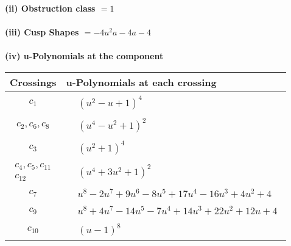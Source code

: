 \documentclass[1p]{elsarticle_modified}
\theoremstyle{definition}
\begin{document}
\flushleft \textbf{(ii) Obstruction class $= 1$}\\~\\
\flushleft \textbf{(iii) Cusp Shapes $= -4 u^2 a-4 a-4$}\\~\\
\newpage\renewcommand{\arraystretch}{1}
\flushleft \textbf{(iv) u-Polynomials at the component}\newline \\
\begin{tabular}{m{50pt}|m{274pt}}
Crossings & \hspace{64pt}u-Polynomials at each crossing \\
\hline $$\begin{aligned}c_{1}\end{aligned}$$&$\begin{aligned}
&(u^2- u+1)^4
\end{aligned}$\\
\hline $$\begin{aligned}c_{2},c_{6},c_{8}\end{aligned}$$&$\begin{aligned}
&(u^4- u^2+1)^2
\end{aligned}$\\
\hline $$\begin{aligned}c_{3}\end{aligned}$$&$\begin{aligned}
&(u^2+1)^4
\end{aligned}$\\
\hline $$\begin{aligned}c_{4},c_{5},c_{11}\\c_{12}\end{aligned}$$&$\begin{aligned}
&(u^4+3 u^2+1)^2
\end{aligned}$\\
\hline $$\begin{aligned}c_{7}\end{aligned}$$&$\begin{aligned}
&u^8-2 u^7+9 u^6-8 u^5+17 u^4-16 u^3+4 u^2+4
\end{aligned}$\\
\hline $$\begin{aligned}c_{9}\end{aligned}$$&$\begin{aligned}
&u^8+4 u^7-14 u^5-7 u^4+14 u^3+22 u^2+12 u+4
\end{aligned}$\\
\hline $$\begin{aligned}c_{10}\end{aligned}$$&$\begin{aligned}
&(u-1)^8
\end{aligned}$\\
\hline
\end{tabular}\\~\\
\end{document}
